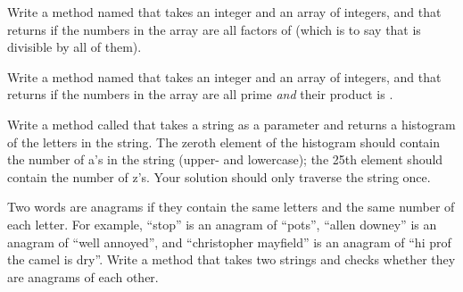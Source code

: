 \begin{exercise}  %

Write a method named  that takes an integer  and an array of integers, and that returns  if the numbers in the array are all factors of  (which is to say that  is divisible by all of them).

\end{exercise}


\begin{exercise}  %

Write a method named  that takes an integer  and an array of integers, and that returns  if the numbers in the array are all prime {\it and} their product is .

\end{exercise}


\begin{exercise}  %

Write a method called  that takes a string as a parameter and returns a histogram of the letters in the string.
The zeroth element of the histogram should contain the number of a's in the string (upper- and lowercase); the 25th element should contain the number of z's.
Your solution should only traverse the string once.

\end{exercise}


\begin{exercise}  %


Two words are anagrams if they contain the same letters and the same number of each letter.
For example, ``stop'' is an anagram of ``pots'', ``allen downey'' is an anagram of ``well annoyed'', and ``christopher mayfield'' is an anagram of ``hi prof the camel is dry''.
Write a method that takes two strings and checks whether they are anagrams of each other.

\end{exercise}
